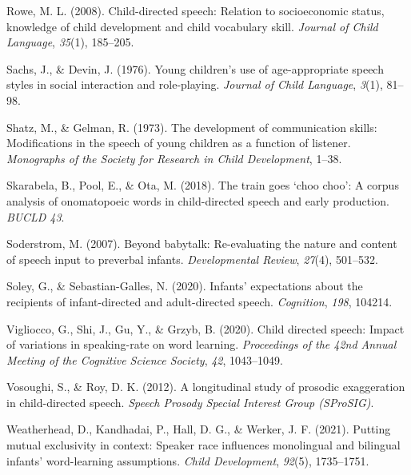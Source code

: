 \documentclass[10pt, letterpaper]{article}
\newenvironment{CSLReferences}%
  {}%
  {\par}
\begin{document}
\begin{CSLReferences}{1}{0}
\leavevmode\hypertarget{ref-rowe2008child}{}%
Rowe, M. L. (2008). Child-directed speech: Relation to socioeconomic
status, knowledge of child development and child vocabulary skill.
\emph{Journal of Child Language}, \emph{35}(1), 185--205.

\leavevmode\hypertarget{ref-sachs1976young}{}%
Sachs, J., \& Devin, J. (1976). Young children's use of age-appropriate
speech styles in social interaction and role-playing. \emph{Journal of
Child Language}, \emph{3}(1), 81--98.

\leavevmode\hypertarget{ref-shatz1973development}{}%
Shatz, M., \& Gelman, R. (1973). The development of communication
skills: Modifications in the speech of young children as a function of
listener. \emph{Monographs of the Society for Research in Child
Development}, 1--38.

\leavevmode\hypertarget{ref-skarabela2018train}{}%
Skarabela, B., Pool, E., \& Ota, M. (2018). The train goes {`choo
choo'}: A corpus analysis of onomatopoeic words in child-directed speech
and early production. \emph{BUCLD 43}.

\leavevmode\hypertarget{ref-soderstrom2007beyond}{}%
Soderstrom, M. (2007). Beyond babytalk: Re-evaluating the nature and
content of speech input to preverbal infants. \emph{Developmental
Review}, \emph{27}(4), 501--532.

\leavevmode\hypertarget{ref-soley2020infants}{}%
Soley, G., \& Sebastian-Galles, N. (2020). Infants' expectations about
the recipients of infant-directed and adult-directed speech.
\emph{Cognition}, \emph{198}, 104214.

\leavevmode\hypertarget{ref-vigliocco2020child}{}%
Vigliocco, G., Shi, J., Gu, Y., \& Grzyb, B. (2020). Child directed
speech: Impact of variations in speaking-rate on word learning.
\emph{Proceedings of the 42nd Annual Meeting of the Cognitive Science
Society}, \emph{42}, 1043--1049.

\leavevmode\hypertarget{ref-vosoughi2012longitudinal}{}%
Vosoughi, S., \& Roy, D. K. (2012). A longitudinal study of prosodic
exaggeration in child-directed speech. \emph{Speech Prosody Special
Interest Group (SProSIG)}.

\leavevmode\hypertarget{ref-weatherhead2021putting}{}%
Weatherhead, D., Kandhadai, P., Hall, D. G., \& Werker, J. F. (2021).
Putting mutual exclusivity in context: Speaker race influences
monolingual and bilingual infants' word-learning assumptions.
\emph{Child Development}, \emph{92}(5), 1735--1751.

\end{CSLReferences}


\end{document}
